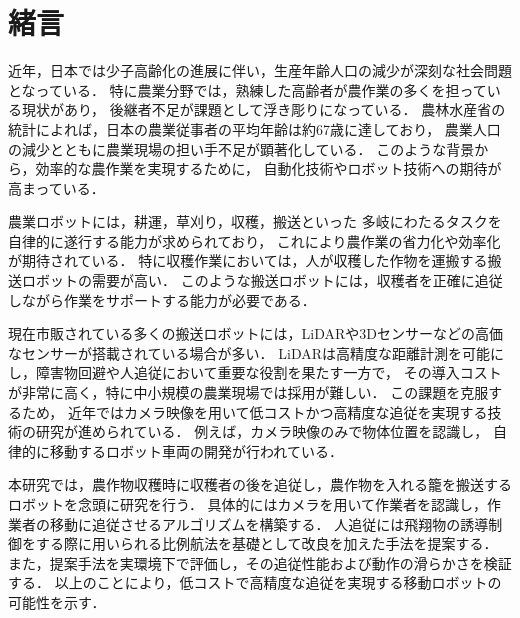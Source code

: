 \section{緒言}
近年，日本では少子高齢化の進展に伴い，生産年齢人口の減少が深刻な社会問題となっている．
特に農業分野では，熟練した高齢者が農作業の多くを担っている現状があり，
後継者不足が課題として浮き彫りになっている．
農林水産省の統計によれば，日本の農業従事者の平均年齢は約67歳に達しており，
農業人口の減少とともに農業現場の担い手不足が顕著化している．
このような背景から，効率的な農作業を実現するために，
自動化技術やロボット技術への期待が高まっている\cite{nougyou}．

農業ロボットには，耕運，草刈り，収穫，搬送といった
多岐にわたるタスクを自律的に遂行する能力が求められており，
これにより農作業の省力化や効率化が期待されている．
特に収穫作業においては，人が収穫した作物を運搬する搬送ロボットの需要が高い\cite{nougyouziritu}．
このような搬送ロボットには，収穫者を正確に追従しながら作業をサポートする能力が必要である．

現在市販されている多くの搬送ロボットには，LiDARや3Dセンサーなどの高価なセンサーが搭載されている場合が多い．
LiDARは高精度な距離計測を可能にし，障害物回避や人追従において重要な役割を果たす一方で，
その導入コストが非常に高く，特に中小規模の農業現場では採用が難しい．
この課題を克服するため，
近年ではカメラ映像を用いて低コストかつ高精度な追従を実現する技術の研究が進められている．
例えば，カメラ映像のみで物体位置を認識し，
自律的に移動するロボット車両の開発が行われている\cite{saga-u}．

本研究では，農作物収穫時に収穫者の後を追従し，農作物を入れる籠を搬送するロボットを念頭に研究を行う．
具体的にはカメラを用いて作業者を認識し，作業者の移動に追従させるアルゴリズムを構築する．
人追従には飛翔物の誘導制御をする際に用いられる比例航法\cite{hirei}\cite{roshon}を基礎として改良を加えた手法を提案する．
また，提案手法を実環境下で評価し，その追従性能および動作の滑らかさを検証する．
以上のことにより，低コストで高精度な追従を実現する移動ロボットの可能性を示す．